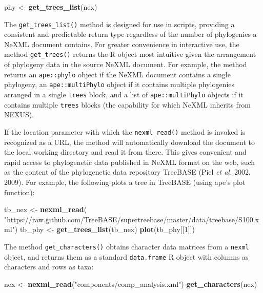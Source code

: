 \documentclass[author-year, review, 11pt]{elsarticle} %
\newenvironment{Shaded}{\begin{snugshade}}{\end{snugshade}}
\newcommand{\KeywordTok}[1]{\textcolor[rgb]{0.13,0.29,0.53}{\textbf{{#1}}}}
\newcommand{\DecValTok}[1]{\textcolor[rgb]{0.00,0.00,0.81}{{#1}}}
\newcommand{\StringTok}[1]{\textcolor[rgb]{0.31,0.60,0.02}{{#1}}}
\newcommand{\NormalTok}[1]{{#1}}
\begin{document}
\begin{Shaded}
\begin{Highlighting}[]
\NormalTok{phy <-}\StringTok{ }\KeywordTok{get_trees_list}\NormalTok{(nex)}
\end{Highlighting}
\end{Shaded}

The \texttt{get\_trees\_list()} method is designed for use in scripts,
providing a consistent and predictable return type regardless of the
number of phylogenies a NeXML document contains. For greater convenience
in interactive use, the method \texttt{get\_trees()} returns the R
object most intuitive given the arrangement of phylogeny data in the
source NeXML document. For example, the method returns an
\texttt{ape::phylo} object if the NeXML document contains a single
phylogeny, an \texttt{ape::multiPhylo} object if it contains multiple
phylogenies arranged in a single \texttt{trees} block, and a list of
\texttt{ape::multiPhylo} objects if it contains multiple \texttt{trees}
blocks (the capability for which NeXML inherits from NEXUS).

If the location parameter with which the \texttt{nexml\_read()} method
is invoked is recognized as a URL, the method will automatically
download the document to the local working directory and read it from
there. This gives convenient and rapid access to phylogenetic data
published in NeXML format on the web, such as the content of the
phylogenetic data repository TreeBASE (Piel \emph{et al.} 2002, 2009).
For example, the following plots a tree in TreeBASE (using ape's plot
function):

\begin{Shaded}
\begin{Highlighting}[]
\NormalTok{tb_nex <-}\StringTok{ }\KeywordTok{nexml_read}\NormalTok{(}
\StringTok{"https://raw.github.com/TreeBASE/supertreebase/master/data/treebase/S100.xml"}\NormalTok{)}
\NormalTok{tb_phy <-}\StringTok{ }\KeywordTok{get_trees_list}\NormalTok{(tb_nex)}
\KeywordTok{plot}\NormalTok{(tb_phy[[}\DecValTok{1}\NormalTok{]]) }
\end{Highlighting}
\end{Shaded}

The method \texttt{get\_characters()} obtains character data matrices
from a \texttt{nexml} object, and returns them as a standard
\texttt{data.frame} R object with columns as characters and rows as
taxa:

\begin{Shaded}
\begin{Highlighting}[]
\NormalTok{nex <-}\StringTok{ }\KeywordTok{nexml_read}\NormalTok{(}\StringTok{"components/comp_analysis.xml"}\NormalTok{)}
\KeywordTok{get_characters}\NormalTok{(nex)}
\end{Highlighting}
\end{Shaded}
\end{document}
